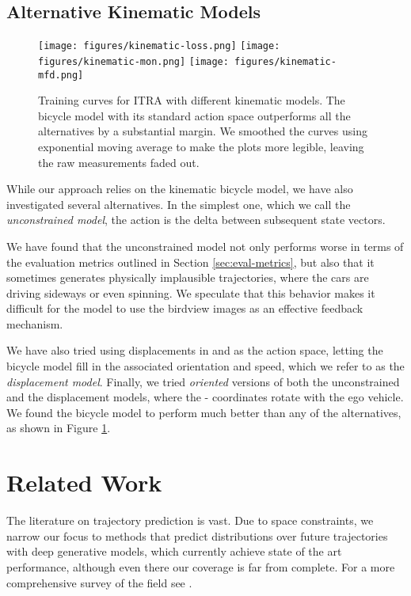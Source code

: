\documentclass[letterpaper, 10 pt, conference]{ieeeconf}
\begin{document}
\subsection{Alternative Kinematic Models} \label{sec:kinematic}

\begin{figure}
    \centering
    \texttt{[image: figures/kinematic-loss.png]}
\texttt{[image: figures/kinematic-mon.png]}
    \texttt{[image: figures/kinematic-mfd.png]}
    \caption{Training curves for ITRA with different kinematic models. The bicycle model with its standard action space outperforms all the alternatives by a substantial margin. We smoothed the curves using exponential moving average to make the plots more legible, leaving the raw measurements faded out.}
    \label{fig:kinematic-ablation}
\end{figure}

While our approach relies on the kinematic bicycle model, we have also investigated several alternatives. In the simplest one, which we call the \emph{unconstrained model}, the action is the delta between subsequent state vectors.

We have found that the unconstrained model not only performs worse in terms of the evaluation metrics outlined in Section \ref{sec:eval-metrics}, but also that it sometimes generates physically implausible trajectories, where the cars are driving sideways or even spinning. We speculate that this behavior makes it difficult for the model to use the birdview images as an effective feedback mechanism.

We have also tried using displacements in  and  as the action space, letting the bicycle model fill in the associated orientation and speed, which we refer to as the \emph{displacement model}. Finally, we tried \emph{oriented} versions of both the unconstrained and the displacement models, where the - coordinates rotate with the ego vehicle. We found the bicycle model to perform much better than any of the alternatives, as shown in Figure \ref{fig:kinematic-ablation}. 



\section{Related Work}

The literature on trajectory prediction is vast. Due to space constraints, we narrow our focus to methods that predict distributions over future trajectories with deep generative models, which currently achieve state of the art performance, although even there our coverage is far from complete. For a more comprehensive survey of the field see \cite{rudenko_human_2020}.
\end{document}
